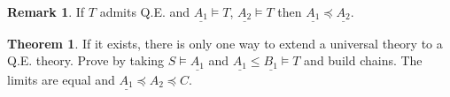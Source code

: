 \documentclass[a4paper,10pt]{article}
\theoremstyle{definition}
\newtheorem{theorem}{Theorem}
\newtheorem*{remark}{Remark}
\begin{document}
\begin{remark}
    If $T$ admits Q.E. and $\underline{A_1} \models T$, $\underline{A_2} \models T$ then $\underline{A_1} \preceq \underline{A_2}$.
\end{remark}

\begin{theorem}
    If it exists, there is only one way to extend a universal theory to a Q.E. theory. Prove by taking $S \models \underline{A_1}$ and $\underline{A_1} \leqslant \underline{B_1} \models T$ and build chains. The limits are equal and $\underline{A_1} \preceq A_2 \preceq C$.
\end{theorem}
\end{document}
